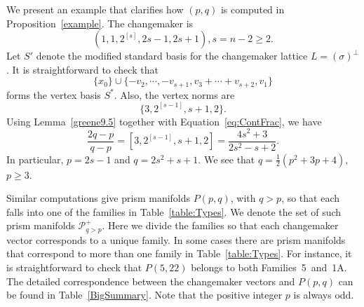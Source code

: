 \begin{ex}
We present an example that clarifies how $(p,q)$ is computed in Proposition~\ref{example}. The changemaker is
\[
(1,1,2^{[s]}, 2s-1,2s+1), s=n-2\ge 2.
\]
Let $S'$ denote the modified standard basis for the changemaker lattice $L= (\sigma)^{\perp}$. It is straightforward to check that 
\[
\{x_0\}\cup\{-v_2, \cdots, -v_{s+1}, v_3+\cdots+v_{s+2}, v_1\}
\]
forms the vertex basis $S^*$. Also, the vertex norms are 
\[
\{3, 2^{[s-1]},s+1, 2\}.
\]
Using Lemma~\ref{greene9.5} together with Equation~\eqref{eq:ContFrac}, we have
\[
\displaystyle \frac{2q-p}{q-p}=[3, 2^{[s-1]},s+1, 2]=\frac{4s^2+3}{2s^2-s+2}.
\]
In particular, $p=2s-1$ and $q=2s^2+s+1$. We see that $q=\frac{1}{2}(p^2+3p+4)$, $p\ge3$.
\end{ex}

Similar computations give prism manifolds $P(p,q)$, with $q>p$, so that each falls into one of the families in Table~\ref{table:Types}. We denote the set of such prism manifolds $\mathcal{P}^+_{q>p}$. Here we divide the families so that each changemaker vector corresponds to a unique family. In some cases there are prism manifolds that correspond to more than one family in Table~\ref{table:Types}. For instance, it is straightforward to check that $P(5,22)$ belongs to both Families~5~and~1A. 
The detailed correspondence between the changemaker vectors and $P(p,q)$ can be found in Table~\ref{BigSummary}. Note that the positive integer $p$ is always odd.
